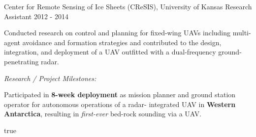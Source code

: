 \begin{cventries}
\cvexpentry
  	{Center for Remote Sensing of Ice Sheets (CReSIS), University of Kansas} %
  	{Research Assistant} %
    {} %
    {2012 - 2014} %
    {
      \begin{cvitems} %
      	\item Conducted research on control and planning for fixed-wing UAVs including multi-agent avoidance and formation strategies and contributed to the design, integration, and deployment of a UAV outfitted with a dual-frequency ground-penetrating radar.
        \item[] \hspace{-1.2em} \emph{Research / Project Milestones:}
        \item Participated in \textbf{8-week deployment} as mission planner and ground station operator for autonomous operations of a radar-
integrated UAV in \textbf{Western Antarctica}, resulting in \emph{first-ever} bed-rock sounding via a UAV. 
      \end{cvitems}
    } %
    {} %
    {true}
    {}
    
\end{cventries}
